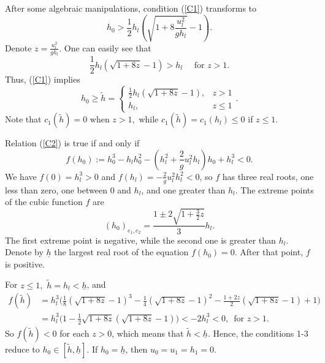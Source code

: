 \documentclass{article}
\theoremstyle{plain}
\theoremstyle{definition}
\theoremstyle{remark}
\begin{document}
After some algebraic 
manipulations, condition (\ref{C1}) transforms to 
\[
h_{0}>\frac{1}{2}h_{l}\left( \sqrt{1+8\frac{u_{l}^{2}}{gh_{l}}}-1 \right).
\]
Denote  $z=\frac{u_{l}^{2}}{gh_{l}}$. One can easily see that 
\[
\frac{1}{2}h_{l}\left( \sqrt{1+8z}-1 \right)>h_l\quad \text{ for }
z>1.
\]
Thus, (\ref{C1}) implies
\[
h_{0}\geq \tilde{h}=
\begin{cases}
\frac{1}{2}h_{l}\left( \sqrt{1+8z}-1 \right), & 
z>1 \\
h_{l}, & z\leq 1
\end{cases}.
\]
Note that $c_1(\tilde{h})=0$ when $z>1,$ while $c_1(\tilde{h})=c_1(h_l)\leq 0$ if $z\leq 1.$

Relation (\ref{C2}) is true if and only if 
\begin{equation} \label{f}
f(h_{0}):=h_{0}^{3}-h_{l}h_{0}^{2}
-(h_{l}^{2}+\frac{2}{g}u_{l}^{2}h_{l})h_{0}+h_{l}^{3}<0.
\end{equation}
We have $f(0)=h_{l}^{3}>0$ and $f(h_{l})=-\frac{2}{g}u_{l}^{2}h_{l}^{2}<0$,
so $f$ has three real roots, one less than zero, one between $0$ and
$h_{l}$, and one greater than $h_{l}$.
The extreme points of the cubic function $f$ are 
\[
(h_{0})_{e_{1},e_{2}}=\frac{1\pm 2\sqrt{1+\frac{3}{2}z}}
{3}h_{l}.
\]
The first extreme point is negative, while the second one is greater than $h_{l}$.
Denote by $\underline{h}$ the largest real root of the equation $f(h_0)=0$.
After that point, $f$ is positive.

For $z\leq 1, $ $\tilde{h}=h_l<\underline{h}$, and
\[\begin{split}
f(\tilde{h})&=h_l^3\Big(\frac{1}{8}(\sqrt{1+8z}-1)^3-\frac{1}{4} (\sqrt{1+8z}-1)^2
-\frac{1+2z}{2}(\sqrt{1+8z}-1)+1\Big)\\
&=h_l^3\Big(1-\frac{1}{2}\sqrt{1+8z}(\sqrt{1+8z}-1)\Big)<-2h_l^3<0, \,\text{ for } z>1.
\end{split}\] 
So $f(\tilde{h})<0$ for each $z>0$, which means that $\tilde{h}<\underline{h}.$
Hence, the conditions 1-3 reduce to $h_0\in[\tilde{h},\underline{h}].$
If $h_0=\underline{h}$, then $u_0=u_1=h_1=0$. 
\medskip
\end{document}
